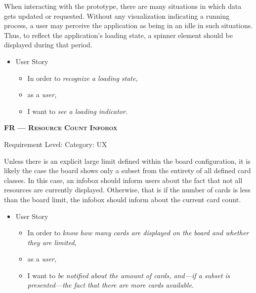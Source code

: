 \noindent When interacting with the prototype, there are many situations in which data gets updated or requested. Without any visualization indicating a running process, a user may perceive the application as being in an idle in such situations. Thus, to reflect the application’s loading state, a spinner element should be displayed during that period. 

\begin{itemize}[after=\vspace{1em}]
    \setlength\itemsep{-0.5em}
	\item[] User Story\\[-7.8mm]
	\begin{itemize}
    \setlength\itemsep{-0.5em}
        \item[] In order to \textit{recognize a loading state,}
        \item[] as a \textit{user,}
        \item[] I want to \textit{see a loading indicator.}
    \end{itemize}
\end{itemize}



\newpage


\centerline{\textbf{FR\textsubscript{} --- \textsc{Resource Count Infobox}}}
\centerline{\small Requirement Level:  \quad{} Category: \acrshort*{UX}}

\noindent Unless there is an explicit large limit defined within the board configuration, it is likely the case the board shows only a subset from the entirety of all defined card classes. In this case, an infobox should inform users about the fact that not all resources are currently displayed. Otherwise, that is if the number of cards is less than the board limit, the infobox should inform about the current card count.



\begin{itemize}[after=\vspace{1em}]
    \setlength\itemsep{-0.5em}
	\item[] User Story\\[-7.8mm]
	\begin{itemize}
    \setlength\itemsep{-0.5em}
        \item[] In order to \textit{know how many cards are displayed on the board and whether they are limited,}
        \item[] as a \textit{user,}
        \item[] I want to \textit{be notified about the amount of cards, and---if a subset is presented---the fact that there are more cards available.}
    \end{itemize}
\end{itemize}




